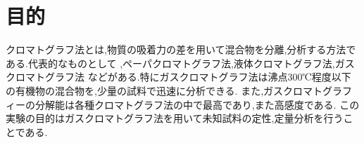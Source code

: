 \section{目的}
クロマトグラフ法とは,物質の吸着力の差を用いて混合物を分離,分析する方法である.代表的なものとして
,ペーパクロマトグラフ法,液体クロマトグラフ法,ガスクロマトグラフ法
などがある.特にガスクロマトグラフ法は沸点300℃程度以下の有機物の混合物を,少量の試料で迅速に分析できる.
また,ガスクロマトグラフィーの分解能は各種クロマトグラフ法の中で最高であり,また高感度である.\cite{BN05476353}
この実験の目的はガスクロマトグラフ法を用いて未知試料の定性,定量分析を行うことである.
